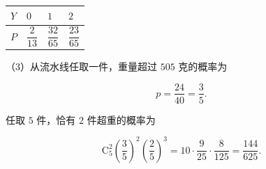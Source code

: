 \begin{answer}
\begin{center}
\begin{tabular}{llll}
\toprule
$Y$ & $0$ & $1$ & $2$ \\
\midrule
$P$ & $\dfrac2{13}$ & $\dfrac{32}{65}$ & $\dfrac{23}{65}$ \\
\bottomrule
\end{tabular}
\end{center}

（3）从流水线任取一件，重量超过 $505$ 克的概率为

\nopagebreak[4]
\[p=\frac{24}{40}=\frac35.\]

任取 $5$ 件，恰有 $2$ 件超重的概率为

\nopagebreak[4]
\[\mathrm C_5^2\left(\frac35\right)^2\left(\frac25\right)^3
=10\cdot\frac9{25}\cdot\frac8{125}
=\frac{144}{625}.\]


\end{answer}
